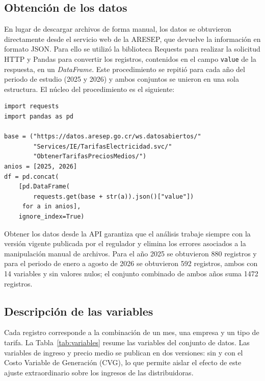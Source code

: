 \documentclass[conference]{IEEEtran}
\begin{document}
\subsection{Obtenci\'on de los datos}

En lugar de descargar archivos de forma manual, los datos se obtuvieron directamente desde el servicio web de la ARESEP, que devuelve la informaci\'on en formato JSON. Para ello se utiliz\'o la biblioteca Requests para realizar la solicitud HTTP y Pandas para convertir los registros, contenidos en el campo \texttt{value} de la respuesta, en un \emph{DataFrame}. Este procedimiento se repiti\'o para cada a\~no del periodo de estudio (2025 y 2026) y ambos conjuntos se unieron en una sola estructura. El n\'ucleo del procedimiento es el siguiente:

{\scriptsize
\begin{verbatim}
import requests
import pandas as pd

base = ("https://datos.aresep.go.cr/ws.datosabiertos/"
        "Services/IE/TarifasElectricidad.svc/"
        "ObtenerTarifasPreciosMedios/")
anios = [2025, 2026]
df = pd.concat(
    [pd.DataFrame(
        requests.get(base + str(a)).json()["value"])
     for a in anios],
    ignore_index=True)
\end{verbatim}
}

Obtener los datos desde la API garantiza que el an\'alisis trabaje siempre con la versi\'on vigente publicada por el regulador y elimina los errores asociados a la manipulaci\'on manual de archivos. Para el a\~no 2025 se obtuvieron 880 registros y para el periodo de enero a agosto de 2026 se obtuvieron 592 registros, ambos con 14 variables y sin valores nulos; el conjunto combinado de ambos a\~nos suma 1472 registros.

\subsection{Descripci\'on de las variables}

Cada registro corresponde a la combinaci\'on de un mes, una empresa y un tipo de tarifa. La Tabla~\ref{tab:variables} resume las variables del conjunto de datos. Las variables de ingreso y precio medio se publican en dos versiones: sin y con el Costo Variable de Generaci\'on (CVG), lo que permite aislar el efecto de este ajuste extraordinario sobre los ingresos de las distribuidoras.
\end{document}
